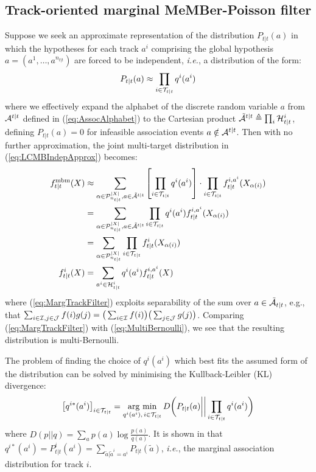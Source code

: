 \documentclass[journal,twoside]{IEEEtran}
\theoremstyle{plain}
\DeclareMathOperator*{\argmin}{arg~min}
\begin{document}
\subsection{Track-oriented marginal MeMBer-Poisson filter}
\label{ss:TOMB}
%
{\noindent}Suppose we seek an approximate representation of the distribution $P_{t|t}(a)$ in which the hypotheses for each track $a^i$ comprising the global hypothesis $a=(a^1,\dots,a^{n_{t|t}})$ are forced to be independent, \textit{i.e.}\xspace, a distribution of the form:
%
\begin{equation}\label{eq:MargTrackFilterWeights}
P_{t|t}(a) \approx \prod_{i\in{\cal T}_{t|t}} q^i(a^i)
\end{equation}
%
where we effectively expand the alphabet of the discrete random variable $a$ from ${\cal A}^{t|t}$ defined in (\ref{eq:AssocAlphabet}) to the Cartesian product $\tilde{{\cal A}}^{t|t}\triangleq\prod_i{\cal H}^i_{t|t}$, defining $P_{t|t}(a)=0$ for infeasible association events $a\notin{\cal A}^{t|t}$. Then with no further approximation, the joint multi-target distribution in (\ref{eq:LCMBIndepApprox}) becomes:
%
\begin{align}
f^\mathrm{mbm}_{t|t}(X) &\approx \sum_{\alpha\in{\cal P}_{n_{t|t}}^{|X|},a\in\tilde{{\cal A}}^{t|t}} \left[\prod_{i\in{\cal T}_{t|t}} q^i(a^i)\right] \cdot \prod_{i\in{\cal T}_{t|t}}f_{t|t}^{i,a^i}(X_{\alpha(i)})  \\
&= \sum_{\alpha\in{\cal P}_{n_{t|t}}^{|X|},a\in\tilde{{\cal A}}^{t|t}} \prod_{i\in{\cal T}_{t|t}}q^i(a^i)f_{t|t}^{i,a^i}(X_{\alpha(i)})  \\
&= \sum_{\alpha\in{\cal P}_{n_{t|t}}^{|X|}}\prod_{i\in{\cal T}_{t|t}}f_{t|t}^i(X_{\alpha(i)}) \label{eq:MargTrackFilter}\\
f_{t|t}^i(X) &= \sum_{a^i\in{\cal H}_{t|t}^i}q^i(a^i)f_{t|t}^{i,a^i}(X)
\end{align}
%
where (\ref{eq:MargTrackFilter}) exploits separability of the sum over $a\in\tilde{{\cal A}}_{t|t}$, e.g., that $\sum_{i\in{\cal I},j\in{\cal J}} f(i)g(j)=\big(\sum_{i\in{\cal I}}f(i)\big)\big(\sum_{j\in{\cal J}}g(j)\big)$. Comparing (\ref{eq:MargTrackFilter}) with (\ref{eq:MultiBernoulli}), we see that the resulting distribution is multi-Bernoulli. 

The problem of finding the choice of $q^i(a^i)$ which best fits the assumed form of the distribution can be solved by minimising the Kullback-Leibler (KL) divergence:
%
\begin{equation}\label{eq:TOMKLOpt}
\left[q^{i*}(a^i)\right]_{i\in{\cal T}_{t|t}} = \argmin_{q^i(a^i),\,i\in{\cal T}_{t|t}}D\bigg(P_{t|t}(a)\bigg|\bigg|\prod_{i\in{\cal T}_{t|t}}q^i(a^i) \bigg)
\end{equation}
%
where $D(p||q) = \sum_a p(a)\log\frac{p(a)}{q(a)}$. It is shown in \cite[p277]{KolFri09} that $q^{i*}(a^i) =  P_{t|t}^i(a^i) = \sum_{\tilde{a}|\tilde{a}^i=a^i}P_{t|t}(\tilde{a})$, \textit{i.e.}\xspace, the marginal association distribution for track $i$. 
\end{document}
